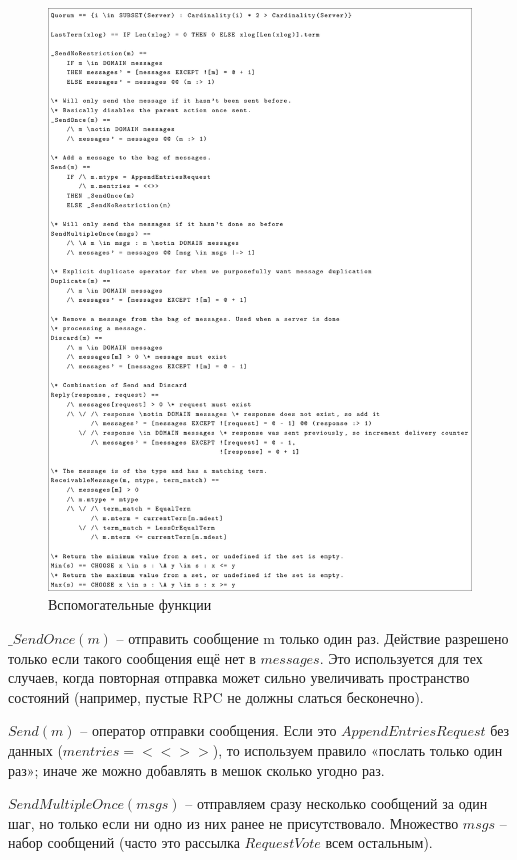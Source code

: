 \begin{figure}
  \centering
  \includegraphics[scale=0.5]{inc/tla-04.png}
  \caption{Вспомогательные функции}
  \label{fig:tla-04}
\end{figure}

$\_SendOnce(m)$ – отправить сообщение m только один раз. Действие разрешено
только если такого сообщения ещё нет в $messages$. Это используется для тех
случаев, когда повторная отправка может сильно увеличивать пространство состояний
(например, пустые RPC не должны слаться бесконечно).

$Send(m)$ – оператор отправки сообщения. Если это $AppendEntriesRequest$ без
данных ($mentries=<<>>$), то используем правило «послать только один раз»; иначе
же можно добавлять в мешок сколько угодно раз.

$SendMultipleOnce(msgs)$ – отправляем сразу несколько сообщений за один шаг, но
только если ни одно из них ранее не присутствовало. Множество $msgs$ – набор
сообщений (часто это рассылка $RequestVote$ всем остальным).

